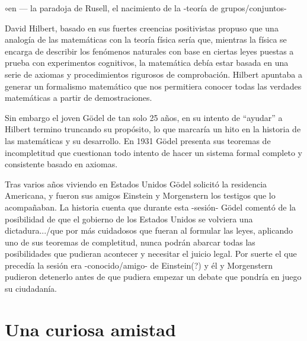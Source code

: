 \documentclass[11pt]{book}
\begin{document}
$\circ$en --- la paradoja de Rusell, el nacimiento de la -teoría de grupos/conjuntos-


David Hilbert, %
basado en sus fuertes creencias positivistas propuso que una analogía de las matemáticas con la teoría física sería que, mientras la física se encarga de describir los fenómenos naturales con base en ciertas leyes puestas a prueba con experimentos cognitivos, la matemática %
debía estar basada en una serie de axiomas y procedimientos rigurosos de comprobación. 
Hilbert apuntaba a generar un formalismo matemático que nos permitiera conocer todas las verdades matemáticas a partir de demostraciones.


Sin embargo el joven Gödel de tan solo 25 años,  %
en su intento de ``ayudar'' a Hilbert termino truncando su propósito, lo que marcaría un hito en la historia de las matemáticas y su desarrollo. En 1931 Gödel presenta sus teoremas de incompletitud que cuestionan todo intento de hacer un sistema formal completo y consistente basado en axiomas. %

Tras varios años viviendo en Estados Unidos Gödel solicitó la residencia Americana, y fueron sus amigos Einstein y Morgenstern los testigos que lo acompañaban. %
La historia cuenta que durante esta -sesión- Gödel comentó de la posibilidad de que el gobierno de los Estados Unidos se volviera una dictadura.../que por más cuidadosos que fueran al formular las leyes, aplicando uno de sus teoremas de completitud, nunca podrán abarcar todas las posibilidades que pudieran acontecer y necesitar el juicio legal. Por suerte el que precedía la sesión era -conocido/amigo- de Einstein(?) y él y Morgenstern pudieron detenerlo antes de que pudiera empezar un debate que pondría en juego su ciudadanía.

\section{Una curiosa amistad}
\end{document}
